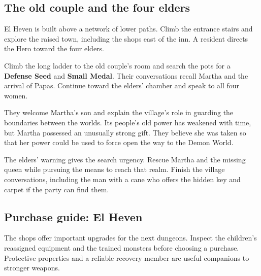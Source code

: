 \subsection*{The old couple and the four elders}

El Heven is built above a network of lower paths. Climb the entrance
stairs and explore the raised town, including the shops east of the
inn. A resident directs the Hero toward the four elders.

Climb the long ladder to the old couple's room and search the pots
for a \textbf{Defense Seed} and \textbf{Small Medal}.
Their conversations recall Martha and the arrival of Papas. Continue
toward the elders' chamber and speak to all four women.

They welcome Martha's son and explain the village's role in guarding
the boundaries between the worlds. Its people's old power has weakened
with time, but Martha possessed an unusually strong gift. They believe
she was taken so that her power could be used to force open the way
to the Demon World.

The elders' warning gives the search urgency. Rescue Martha and the
missing queen while pursuing the means to reach that realm. Finish
the village conversations, including the man with a cane who offers
the hidden key and carpet if the party can find them.

\subsection*{Purchase guide: El Heven}

The shops offer important upgrades for the next dungeons. Inspect
the children's reassigned equipment and the trained monsters before
choosing a purchase. Protective properties and a reliable recovery
member are useful companions to stronger weapons.

